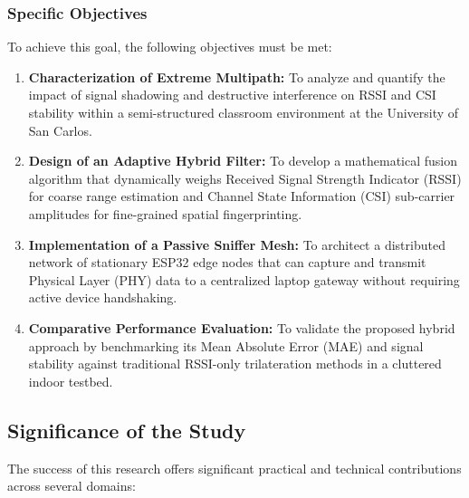 \subsubsection{Specific Objectives}
To achieve this goal, the following objectives must be met:
\begin{enumerate}
    \item \textbf{Characterization of Extreme Multipath:} To analyze and quantify the impact of signal shadowing and destructive interference on RSSI and CSI stability within a semi-structured classroom environment at the University of San Carlos.
    \item \textbf{Design of an Adaptive Hybrid Filter:} To develop a mathematical fusion algorithm that dynamically weighs Received Signal Strength Indicator (RSSI) for coarse range estimation and Channel State Information (CSI) sub-carrier amplitudes for fine-grained spatial fingerprinting.
    \item \textbf{Implementation of a Passive Sniffer Mesh:} To architect a distributed network of stationary ESP32 edge nodes that can capture and transmit Physical Layer (PHY) data to a centralized laptop gateway without requiring active device handshaking.
    \item \textbf{Comparative Performance Evaluation:} To validate the proposed hybrid approach by benchmarking its Mean Absolute Error (MAE) and signal stability against traditional RSSI-only trilateration methods in a cluttered indoor testbed.
\end{enumerate}

\subsection{Significance of the Study}
The success of this research offers significant practical and technical contributions across several domains:

